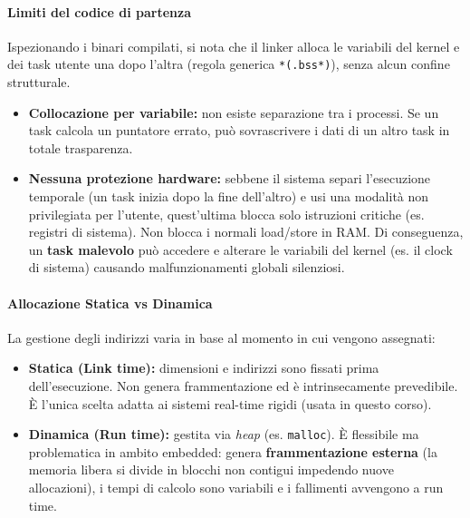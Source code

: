 \paragraph*{Limiti del codice di partenza}
Ispezionando i binari compilati, si nota che il linker alloca le variabili del kernel e dei task utente una dopo l'altra (regola generica \texttt{*(.bss*)}), senza alcun confine strutturale.
\begin{itemize}
    \item \textbf{Collocazione per variabile:} non esiste separazione tra i processi. Se un task calcola un puntatore errato, può sovrascrivere i dati di un altro task in totale trasparenza.
    \item \textbf{Nessuna protezione hardware:} sebbene il sistema separi l'esecuzione temporale (un task inizia dopo la fine dell'altro) e usi una modalità non privilegiata per l'utente, quest'ultima blocca solo istruzioni critiche (es. registri di sistema). Non blocca i normali load/store in RAM. Di conseguenza, un \textbf{task malevolo} può accedere e alterare le variabili del kernel (es. il clock di sistema) causando malfunzionamenti globali silenziosi.
\end{itemize}

\paragraph*{Allocazione Statica vs Dinamica}
La gestione degli indirizzi varia in base al momento in cui vengono assegnati:
\begin{itemize}
    \item \textbf{Statica (Link time):} dimensioni e indirizzi sono fissati prima dell'esecuzione. Non genera frammentazione ed è intrinsecamente prevedibile. È l'unica scelta adatta ai sistemi real-time rigidi (usata in questo corso).
    \item \textbf{Dinamica (Run time):} gestita via \emph{heap} (es. \texttt{malloc}). È flessibile ma problematica in ambito embedded: genera \textbf{frammentazione esterna} (la memoria libera si divide in blocchi non contigui impedendo nuove allocazioni), i tempi di calcolo sono variabili e i fallimenti avvengono a run time.
\end{itemize}


